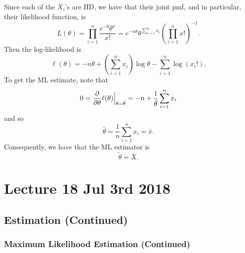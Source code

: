 \documentclass[notoc,notitlepage]{tufte-book}
\begin{document}
\begin{solution}
  Since each of the $X_i$'s are IID, we have that their joint pmf, and in particular, their likelihood function, is
  \begin{equation*}
    L(\theta) = \prod_{i=1}^{n} \frac{e^{- \theta } \theta^x}{x!} = e^{-n \theta} \theta^{ \sum\limits_{i=1}^{n} x_i } \left( \prod\limits_{i=1}^{n} x! \right)^{-1}.
  \end{equation*}
  Then the log-likelihood is
  \begin{equation*}
    \ell(\theta) = - n \theta + \left( \sum_{i=1}^{n} x_i \right) \log \theta - \sum_{i=1}^{n} \log ( x_i ! ).
  \end{equation*}
  To get the ML estimate, note that
  \begin{equation*}
    0 = \frac{\partial}{\partial \theta} \ell(\theta) \Big|_{\theta = \hat{\theta}}^{} = -n + \frac{1}{\hat{ \theta }} \sum_{i=1}^{n} x_i
  \end{equation*}
  and so
  \begin{equation*}
    \hat{\theta} = \frac{1}{n} \sum^{n}_{i=1} x_i = \bar{x}.
  \end{equation*}
  Consequently, we have that the ML estimator is
  \begin{equation*}
    \tilde{\theta} = \bar{X}.
  \end{equation*}
\end{solution}




\chapter{Lecture 18 Jul 3rd 2018}%
\label{chp:lecture_18_jul_3rd_2018}

\section{Estimation (Continued)}%
\label{sec:estimation_continued}

\subsection{Maximum Likelihood Estimation (Continued)}%
\label{sub:maximum_likelihood_estimation_continued}
\end{document}
